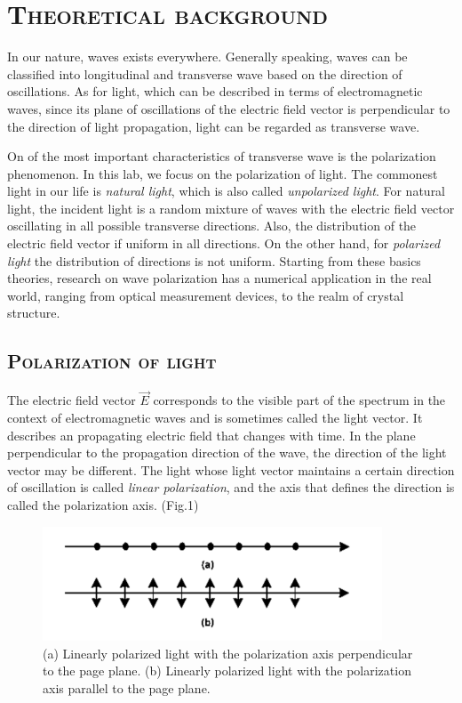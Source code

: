 \documentclass[a4paper,12pt]{article}
\begin{document}
\section{\textsc{Theoretical background}}
In our nature, waves exists everywhere. Generally speaking, waves can be classified into longitudinal and transverse wave based on the direction of oscillations. As for light, which can be described in terms of electromagnetic waves, since its plane of oscillations of the electric field vector is perpendicular to the direction of light propagation, light can be regarded as transverse wave. 
\par On of the most important characteristics of transverse wave is the polarization phenomenon. In this lab, we focus on the polarization of light. The commonest light in our life is \textit{natural light}, which is also called \emph{unpolarized light}. For natural light, the incident light is a random mixture of waves with the electric field vector oscillating in all possible transverse directions. Also, the distribution of the electric field vector if uniform in all directions. On the other hand, for \textit{polarized light} the distribution of directions is not uniform. Starting from these basics theories, research on wave polarization has a numerical application in the real world, ranging from optical measurement devices, to the realm of crystal structure.

\subsection{\textsc{Polarization of light}}
The electric field vector $\vec{E}$ corresponds to the visible part of the spectrum in the context of electromagnetic waves and is sometimes called the light vector. It describes an propagating electric field that changes with time. In the plane perpendicular to the propagation direction of the wave, the direction of the light vector may be different. The light whose light vector maintains a certain direction of oscillation is called \textit{linear polarization}, and the axis that defines the direction is called the polarization axis. (Fig.1)

\begin{figure}[h] 
    \centering
    \includegraphics[width=0.9\textwidth]{Fig1} 
    \caption{(a) Linearly polarized light with the polarization axis perpendicular to the page plane. (b) Linearly polarized light with the polarization axis parallel to the page plane. \cite{labmanual}} 
\end{figure}
\end{document}
